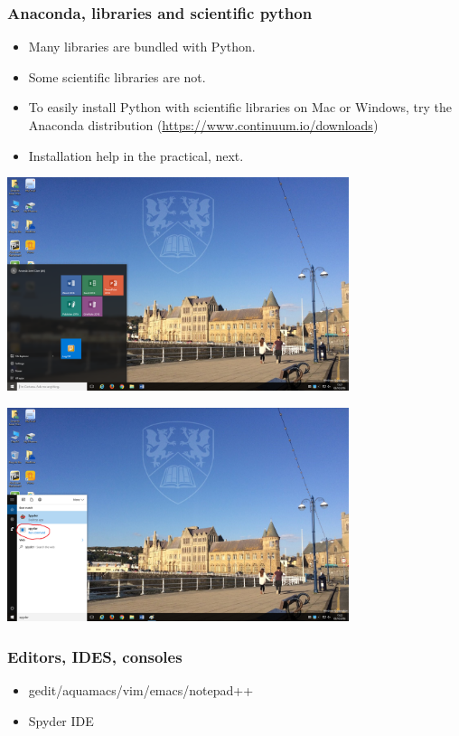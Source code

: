 \documentclass{beamer}
\begin{document}
\begin{frame}
\frametitle{Anaconda, libraries and scientific python}
\begin{itemize}
\item Many libraries are bundled with Python.
\item Some scientific libraries are not.
\item To easily install Python with scientific libraries on Mac or Windows, try the
  Anaconda distribution (\url{https://www.continuum.io/downloads})
\item Installation help in the practical, next.
\end{itemize}
\end{frame}


\begin{frame}
\begin{center}
\includegraphics[width=10cm]{windows10.png}
\end{center}
\end{frame}

\begin{frame}
\begin{center}
\includegraphics[width=10cm]{choosespyder.png}
\end{center}
\end{frame}


\begin{frame}
\frametitle{Editors, IDES, consoles}
\begin{itemize}
\item gedit/aquamacs/vim/emacs/notepad++ 
\item Spyder IDE
\end{itemize}
\end{frame}
\end{document}
